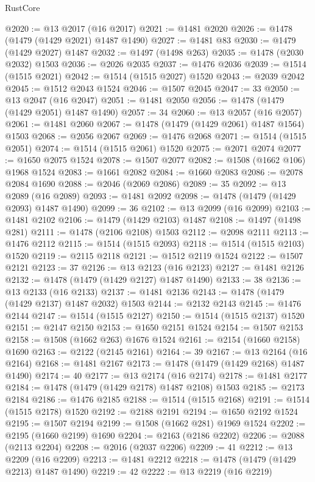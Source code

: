 \begin{lexlean}{RustCore}
\begin{coremodule}
@2020 := @13 @2017 (@16 @2017)
@2021 := @1481 @2020
@2026 := @1478 (@1479 (@1429 @2021) @1487 @1490)
@2027 := @1481 @83
@2030 := @1479 (@1429 @2027) @1487
@2032 := @1497 (@1498 @263)
@2035 := @1478 (@2030 @2032) @1503
@2036 := @2026 @2035
@2037 := @1476 @2036
@2039 := @1514 (@1515 @2021)
@2042 := @1514 (@1515 @2027) @1520
@2043 := @2039 @2042
@2045 := @1512 @2043 @1524
@2046 := @1507 @2045
@2047 := 33
@2050 := @13 @2047 (@16 @2047)
@2051 := @1481 @2050
@2056 := @1478 (@1479 (@1429 @2051) @1487 @1490)
@2057 := 34
@2060 := @13 @2057 (@16 @2057)
@2061 := @1481 @2060
@2067 := @1478 (@1479 (@1429 @2061) @1487 @1564) @1503
@2068 := @2056 @2067
@2069 := @1476 @2068
@2071 := @1514 (@1515 @2051)
@2074 := @1514 (@1515 @2061) @1520
@2075 := @2071 @2074
@2077 := @1650 @2075 @1524
@2078 := @1507 @2077
@2082 := @1508 (@1662 @106) @1968 @1524
@2083 := @1661 @2082
@2084 := @1660 @2083
@2086 := @2078 @2084 @1690
@2088 := @2046 (@2069 @2086)
@2089 := 35
@2092 := @13 @2089 (@16 @2089)
@2093 := @1481 @2092
@2098 := @1478 (@1479 (@1429 @2093) @1487 @1490)
@2099 := 36
@2102 := @13 @2099 (@16 @2099)
@2103 := @1481 @2102
@2106 := @1479 (@1429 @2103) @1487
@2108 := @1497 (@1498 @281)
@2111 := @1478 (@2106 @2108) @1503
@2112 := @2098 @2111
@2113 := @1476 @2112
@2115 := @1514 (@1515 @2093)
@2118 := @1514 (@1515 @2103) @1520
@2119 := @2115 @2118
@2121 := @1512 @2119 @1524
@2122 := @1507 @2121
@2123 := 37
@2126 := @13 @2123 (@16 @2123)
@2127 := @1481 @2126
@2132 := @1478 (@1479 (@1429 @2127) @1487 @1490)
@2133 := 38
@2136 := @13 @2133 (@16 @2133)
@2137 := @1481 @2136
@2143 := @1478 (@1479 (@1429 @2137) @1487 @2032) @1503
@2144 := @2132 @2143
@2145 := @1476 @2144
@2147 := @1514 (@1515 @2127)
@2150 := @1514 (@1515 @2137) @1520
@2151 := @2147 @2150
@2153 := @1650 @2151 @1524
@2154 := @1507 @2153
@2158 := @1508 (@1662 @263) @1676 @1524
@2161 := @2154 (@1660 @2158) @1690
@2163 := @2122 (@2145 @2161)
@2164 := 39
@2167 := @13 @2164 (@16 @2164)
@2168 := @1481 @2167
@2173 := @1478 (@1479 (@1429 @2168) @1487 @1490)
@2174 := 40
@2177 := @13 @2174 (@16 @2174)
@2178 := @1481 @2177
@2184 := @1478 (@1479 (@1429 @2178) @1487 @2108) @1503
@2185 := @2173 @2184
@2186 := @1476 @2185
@2188 := @1514 (@1515 @2168)
@2191 := @1514 (@1515 @2178) @1520
@2192 := @2188 @2191
@2194 := @1650 @2192 @1524
@2195 := @1507 @2194
@2199 := @1508 (@1662 @281) @1969 @1524
@2202 := @2195 (@1660 @2199) @1690
@2204 := @2163 (@2186 @2202)
@2206 := @2088 (@2113 @2204)
@2208 := @2016 (@2037 @2206)
@2209 := 41
@2212 := @13 @2209 (@16 @2209)
@2213 := @1481 @2212
@2218 := @1478 (@1479 (@1429 @2213) @1487 @1490)
@2219 := 42
@2222 := @13 @2219 (@16 @2219)

\end{coremodule}
\end{lexlean}
